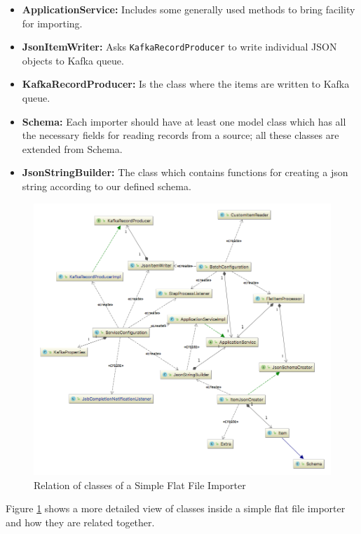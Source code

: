 \begin{itemize}
	\begin{itemize}
		\item \textbf{ApplicationService:} Includes some generally used methods to bring facility for importing.
		\item \textbf{JsonItemWriter:} Asks \texttt{KafkaRecordProducer} to write individual JSON objects to Kafka queue.
		\item \textbf{KafkaRecordProducer:} Is the class where the items are written to Kafka queue.
		\item \textbf{Schema:} Each importer should have at least one model class which has all the necessary fields for reading records from a source; all these classes are extended from Schema.
		\item \textbf{JsonStringBuilder:} The class which contains functions for creating a json string according to our defined schema.
	\end{itemize}

\end{itemize}

\begin{figure}%
	\includegraphics[width=1.00\textwidth]{images/domain_model.png}
	\caption{Relation of classes of a Simple Flat File Importer}%
	\label{fig:importer-classes-relations}%
\end{figure}


Figure \ref{fig:importer-classes-relations} shows a more detailed view of classes inside a simple flat file importer and how they are related together.

